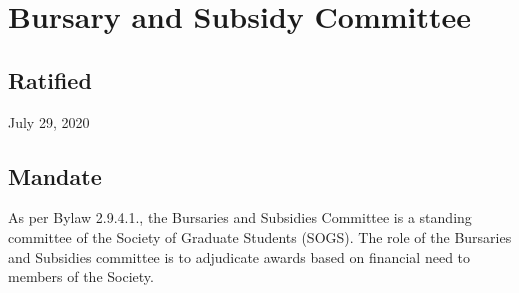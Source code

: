 \section{Bursary and Subsidy Committee}

\subsection{Ratified}
July 29, 2020

\subsection{Mandate}
As per Bylaw 2.9.4.1., the Bursaries and Subsidies Committee is a standing committee of the Society of Graduate Students (SOGS). The role of the Bursaries and Subsidies committee is to adjudicate awards based on financial need to members of the Society.

